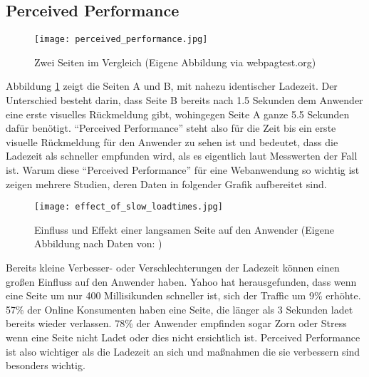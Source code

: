 	\pagebreak


	\subsection{Perceived Performance} %
	\label{sub:perceived_performance}
		\begin{figure}[htbp]
			\begin{center}
				\texttt{[image: perceived\_performance.jpg]}
				\caption{Zwei Seiten im Vergleich (Eigene Abbildung via webpagtest.org)}
				\label{fig:perceived_performance}
			\end{center}
		\end{figure}

		Abbildung \ref{fig:perceived_performance} zeigt die Seiten A und B, mit nahezu identischer Ladezeit. Der Unterschied besteht darin, dass Seite B bereits nach 1.5 Sekunden dem Anwender eine erste visuelles Rückmeldung gibt, wohingegen Seite A ganze 5.5 Sekunden dafür benötigt.
		"`Perceived Performance"' steht also für die Zeit bis ein erste visuelle Rückmeldung für den Anwender zu sehen ist und bedeutet, dass die Ladezeit als schneller empfunden wird, als es eigentlich laut Messwerten der Fall ist. Warum diese "`Perceived Performance"' für eine Webanwendung so wichtig ist zeigen mehrere Studien, deren Daten in folgender Grafik aufbereitet sind.

		\begin{figure}[htbp]
			\begin{center}
				\texttt{[image: effect\_of\_slow\_loadtimes.jpg]}
				\caption{Einfluss und Effekt einer langsamen Seite auf den Anwender (Eigene Abbildung nach Daten von: \autocite[p. 8]{radware14})}
				\label{fig:effect_of_slow_loadtimes}
			\end{center}
		\end{figure}

		Bereits kleine Verbesser- oder Verschlechterungen der Ladezeit können einen großen Einfluss auf den Anwender haben. Yahoo hat herausgefunden, dass wenn eine Seite um nur 400 Millisikunden schneller ist, sich der Traffic um 9\% erhöhte.\autocite{stefanov08} 57\% der Online Konsumenten haben eine Seite, die länger als 3 Sekunden ladet bereits wieder verlassen. 78\% der Anwender empfinden sogar Zorn oder Stress wenn eine Seite nicht Ladet oder dies nicht ersichtlich ist. Perceived Performance ist also wichtiger als die Ladezeit an sich und maßnahmen die sie verbessern sind besonders wichtig.

